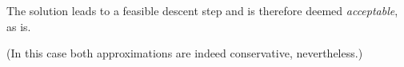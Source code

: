 \bigskip
 The solution leads to a feasible descent step and                     is therefore deemed \emph{acceptable}, as is. 
 
(In this case both approximations are indeed conservative,                         nevertheless.)